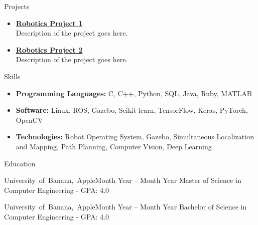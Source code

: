\documentclass[]{../mcdowellcv}
\begin{document}
\begin{cvsection}{Projects}

    \begin{cvsubsection}{}{}{}
        \begin{itemize}
            \setlength\itemsep{3pt}
            \item\textbf{\href{https://github.com/johndoe/beepboop}{Robotics Project 1}} \\
            Description of the project goes here.
        \end{itemize}
    \end{cvsubsection}
    
    \begin{cvsubsection}{}{}{}
        \begin{itemize}
            \setlength\itemsep{3pt}
            \item\textbf{\href{https://github.com/johndoe/beepboop}{Robotics Project 2}} \\
            Description of the project goes here.
        \end{itemize}
    \end{cvsubsection}
    
\end{cvsection}

\begin{cvsection}{Skills}
    \begin{cvsubsection}{}{}{}
        \begin{itemize}
            \item \textbf{Programming Languages:} C, C++, Python, SQL, Java, Ruby, MATLAB
            \item \textbf{Software:} Linux, ROS, Gazebo, Scikit-learn, TensorFlow, Keras, PyTorch, OpenCV
            \item \textbf{Technologies:} Robot Operating System, Gazebo, Simultaneous Localization and Mapping, Path Planning, Computer Vision, Deep Learning
        \end{itemize}
    \end{cvsubsection}
\end{cvsection}

\begin{cvsection}{Education}

    \begin{cvsubsection}{\mbox {University of Banana, Apple}}{}{Month Year -- Month Year}
        Master of Science in Computer Engineering - GPA: 4.0
    \end{cvsubsection}
    
    \begin{cvsubsection}{\mbox {University of Banana, Apple}}{}{Month Year -- Month Year}
        Bachelor of Science in Computer Engineering - GPA: 4.0
    \end{cvsubsection}
     
\end{cvsection}
\end{document}
